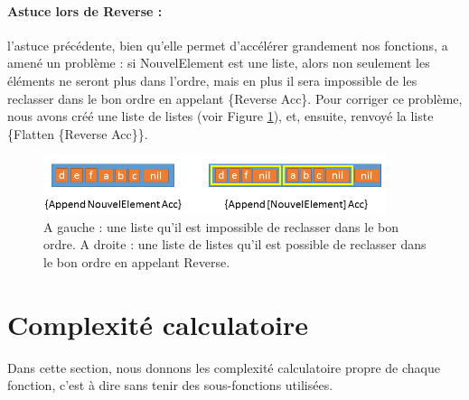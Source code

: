 \documentclass[10pt,a4paper]{article}
\begin{document}
\paragraph{Astuce lors de Reverse :} 
l'astuce précédente, bien qu'elle permet d'accélérer grandement nos fonctions, a amené un problème :
si NouvelElement est une liste, alors non seulement les éléments ne seront plus dans l'ordre,
mais en plus il sera impossible de les reclasser dans le bon ordre en appelant \{Reverse Acc\}. 
Pour corriger ce problème, nous avons  créé une liste de listes (voir Figure \ref{fig:astuceReverse}), 
et, ensuite, renvoyé la liste \{Flatten \{Reverse Acc\}\}.

\begin{figure}[h!]
	\centering
	\includegraphics[width=10cm]{images/AstuceAppend.png}
	\caption{A gauche : une liste qu'il est impossible de reclasser dans le bon ordre. 
	A droite : une liste de listes qu'il est possible de reclasser dans le bon ordre en appelant Reverse.}
	\label{fig:astuceReverse}
\end{figure}

\section{Complexité calculatoire}
Dans cette section, nous donnons les complexité calculatoire
propre de chaque fonction, c'est à dire sans tenir des sous-fonctions
utilisées.
\end{document}
